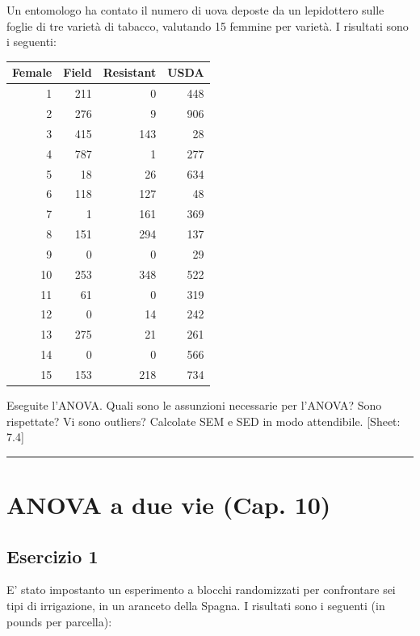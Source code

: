 \documentclass[a4paper,12pt,oneside]{book}
\begin{document}
Un entomologo ha contato il numero di uova deposte da un lepidottero sulle foglie di tre varietà di tabacco, valutando 15 femmine per varietà. I risultati sono i seguenti:

\begin{longtable}[]{@{}rrrr@{}}
\toprule
Female & Field & Resistant & USDA \\
\midrule
\endhead
1 & 211 & 0 & 448 \\
2 & 276 & 9 & 906 \\
3 & 415 & 143 & 28 \\
4 & 787 & 1 & 277 \\
5 & 18 & 26 & 634 \\
6 & 118 & 127 & 48 \\
7 & 1 & 161 & 369 \\
8 & 151 & 294 & 137 \\
9 & 0 & 0 & 29 \\
10 & 253 & 348 & 522 \\
11 & 61 & 0 & 319 \\
12 & 0 & 14 & 242 \\
13 & 275 & 21 & 261 \\
14 & 0 & 0 & 566 \\
15 & 153 & 218 & 734 \\
\bottomrule
\end{longtable}

Eseguite l'ANOVA. Quali sono le assunzioni necessarie per l'ANOVA? Sono rispettate? Vi sono outliers? Calcolate SEM e SED in modo attendibile.
{[}Sheet: 7.4{]}

\begin{center}\rule{0.5\linewidth}{0.5pt}\end{center}

\hypertarget{anova-a-due-vie-cap.-10}{%
\section{ANOVA a due vie (Cap. 10)}\label{anova-a-due-vie-cap.-10}}

\hypertarget{esercizio-1-6}{%
\subsection{Esercizio 1}\label{esercizio-1-6}}

E' stato impostanto un esperimento a blocchi randomizzati per confrontare sei tipi di irrigazione, in un aranceto della Spagna. I risultati sono i seguenti (in pounds per parcella):
\end{document}
